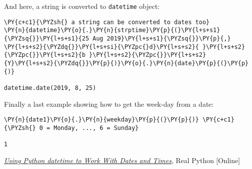 And here, a string is converted to \texttt{datetime} object:

\begin{codebox}
\begin{Verbatim}[commandchars=\\\{\}]
\PY{c+c1}{\PYZsh{} a string can be converted to dates too}
\PY{n}{datetime}\PY{o}{.}\PY{n}{strptime}\PY{p}{(}\PY{l+s+s1}{\PYZsq{}}\PY{l+s+s1}{25 Aug 2019}\PY{l+s+s1}{\PYZsq{}}\PY{p}{,} \PY{l+s+s2}{\PYZdq{}}\PY{l+s+si}{\PYZpc{}d}\PY{l+s+s2}{ }\PY{l+s+s2}{\PYZpc{}}\PY{l+s+s2}{b }\PY{l+s+s2}{\PYZpc{}}\PY{l+s+s2}{Y}\PY{l+s+s2}{\PYZdq{}}\PY{p}{)}\PY{o}{.}\PY{n}{date}\PY{p}{(}\PY{p}{)}

datetime.date(2019, 8, 25)
\end{Verbatim}
\end{codebox}

Finally a last example showing how to get the week-day from a date:

\begin{codebox}
\begin{Verbatim}[commandchars=\\\{\}]
\PY{n}{date1}\PY{o}{.}\PY{n}{weekday}\PY{p}{(}\PY{p}{)} \PY{c+c1}{\PYZsh{} 0 = Monday, ..., 6 = Sunday}

1
\end{Verbatim}
\end{codebox}

\begin{thebibliography}{9}
 \href{https://realpython.com/python-datetime/}{\emph{Using Python datetime to Work With Dates and Times}}, Real Python [Online]
\end{thebibliography}